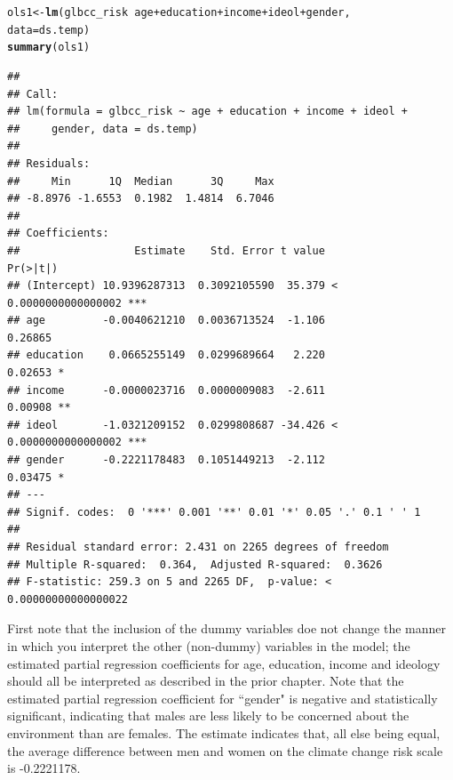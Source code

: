 \documentclass[11pt,openany]{book}\usepackage[]{graphicx}\usepackage[]{color}
\makeatletter
\newcommand{\hlopt}[1]{\textcolor[rgb]{0,0,0}{#1}}%
\newcommand{\hlstd}[1]{\textcolor[rgb]{0.345,0.345,0.345}{#1}}%
\newcommand{\hlkwb}[1]{\textcolor[rgb]{0.69,0.353,0.396}{#1}}%
\newcommand{\hlkwc}[1]{\textcolor[rgb]{0.333,0.667,0.333}{#1}}%
\newcommand{\hlkwd}[1]{\textcolor[rgb]{0.737,0.353,0.396}{\textbf{#1}}}%
\newenvironment{kframe}{%
 \def\at@end@of@kframe{}%
 \ifinner\ifhmode%
  \def\at@end@of@kframe{\end{minipage}}%
  \begin{minipage}{\columnwidth}%
 \fi\fi%
 \def\FrameCommand##1{\hskip\@totalleftmargin \hskip-\fboxsep
 \colorbox{shadecolor}{##1}\hskip-\fboxsep
     \hskip-\linewidth \hskip-\@totalleftmargin \hskip\columnwidth}%
 \MakeFramed {\advance\hsize-\width
   \@totalleftmargin\z@ \linewidth\hsize
   \@setminipage}}%
 {\par\unskip\endMakeFramed%
 \at@end@of@kframe}
\newenvironment{knitrout}{}{} %
\renewenvironment{knitrout}{\begin{singlespace}}{\end{singlespace}} %
\makeatother
\begin{document}
\begin{knitrout}
\color{fgcolor}\begin{kframe}
\begin{alltt}
\hlstd{ols1} \hlkwb{<-} \hlkwd{lm}\hlstd{(glbcc_risk} \hlopt{~} \hlstd{age} \hlopt{+} \hlstd{education} \hlopt{+} \hlstd{income} \hlopt{+} \hlstd{ideol} \hlopt{+} \hlstd{gender,}
    \hlkwc{data} \hlstd{= ds.temp)}
\hlkwd{summary}\hlstd{(ols1)}
\end{alltt}
\begin{verbatim}
## 
## Call:
## lm(formula = glbcc_risk ~ age + education + income + ideol + 
##     gender, data = ds.temp)
## 
## Residuals:
##     Min      1Q  Median      3Q     Max 
## -8.8976 -1.6553  0.1982  1.4814  6.7046 
## 
## Coefficients:
##                  Estimate    Std. Error t value             Pr(>|t|)    
## (Intercept) 10.9396287313  0.3092105590  35.379 < 0.0000000000000002 ***
## age         -0.0040621210  0.0036713524  -1.106              0.26865    
## education    0.0665255149  0.0299689664   2.220              0.02653 *  
## income      -0.0000023716  0.0000009083  -2.611              0.00908 ** 
## ideol       -1.0321209152  0.0299808687 -34.426 < 0.0000000000000002 ***
## gender      -0.2221178483  0.1051449213  -2.112              0.03475 *  
## ---
## Signif. codes:  0 '***' 0.001 '**' 0.01 '*' 0.05 '.' 0.1 ' ' 1
## 
## Residual standard error: 2.431 on 2265 degrees of freedom
## Multiple R-squared:  0.364,	Adjusted R-squared:  0.3626 
## F-statistic: 259.3 on 5 and 2265 DF,  p-value: < 0.00000000000000022
\end{verbatim}
\end{kframe}
\end{knitrout}
First note that the inclusion of the dummy variables doe not change the manner in which you interpret the other (non-dummy) variables in the model; the estimated partial regression coefficients for age, education, income and ideology should all be interpreted as described in the prior chapter. Note that the estimated partial regression coefficient for ``gender" is negative and statistically significant, indicating that males are less likely to be concerned about the environment than are females. The estimate indicates that, all else being equal, the average difference between men and women on the climate change risk scale is -0.2221178. 

\end{document}
